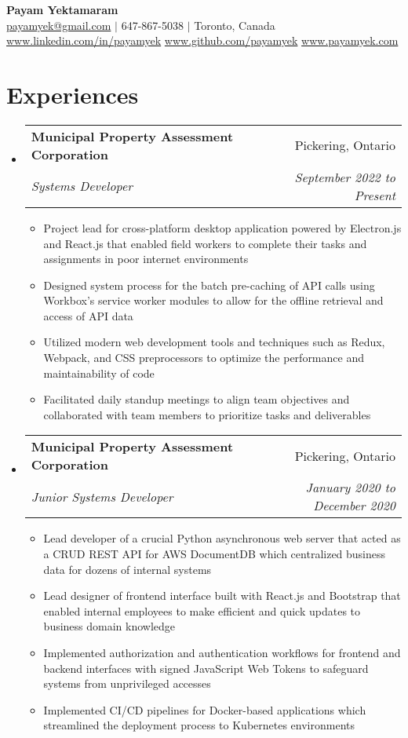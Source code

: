 \documentclass[letterpaper,10pt]{article}
\makeatletter
\newcommand{\resumeSubheading}[4]{
  \vspace{-1pt}\item
    \begin{tabular*}{0.97\textwidth}{l@{\extracolsep{\fill}}r}
      \textbf{#1} & #2 \\
      \textit{\small#3} & \textit{\small #4} \\
    \end{tabular*}\vspace{-2pt}
}
\newcommand{\resumeSubHeadingListStart}{\begin{itemize}[leftmargin=*]}
\newcommand{\resumeSubHeadingListEnd}{\end{itemize}}
\newcommand{\resumeItemListStart}{\begin{itemize}}
\newcommand{\resumeItemListEnd}{\end{itemize}\vspace{-3pt}}
\makeatother
\begin{document}
\textbf{\Huge Payam Yektamaram}\vspace{3pt}\\
\href{payamyek@gmail.com}{payamyek@gmail.com} $\big|$ 647-867-5038 $\big|$ Toronto, Canada \vspace{3pt} \\
\hspace{-6.4pt} \href{https://ca.linkedin.com/in/payamyek}{www.linkedin.com/in/payamyek} \hspace{3pt} \href{https://github.com/payamyek}{www.github.com/payamyek} \hspace{3pt} \href{https://payamyek.ca}{www.payamyek.com} \\

\section{Experiences}
  \resumeSubHeadingListStart
   \resumeSubheading
      {Municipal Property Assessment Corporation}{Pickering, Ontario}
      {Systems Developer}{September 2022 to Present}
      \resumeItemListStart
        \item{ \small{ Project lead for cross-platform desktop application powered by Electron.js and React.js that enabled field workers to complete their tasks and assignments in poor internet environments } }
        \item{ \small{ Designed system process for the batch pre-caching of API calls using Workbox's service worker modules to allow for the offline retrieval and access of API data  }}
        \item {\small { Utilized modern web development tools and techniques such as Redux, Webpack, and CSS preprocessors to optimize the performance and maintainability of code }}
        \item{ \small{ Facilitated daily standup meetings to align team objectives and collaborated with team members to prioritize tasks and deliverables }}
       \resumeItemListEnd
  
    \resumeSubheading
      {Municipal Property Assessment Corporation}{Pickering, Ontario}
      {Junior Systems Developer}{January 2020 to December 2020}
      \resumeItemListStart
        \item{ \small{ Lead developer of a crucial Python asynchronous web server that acted as a CRUD REST API for AWS DocumentDB which centralized business data for dozens of internal systems }}
        \item{ \small{ Lead designer of frontend interface built with React.js and Bootstrap that enabled internal employees to make efficient and quick updates to business domain knowledge }}
        \item{\small{ Implemented authorization and authentication workflows for frontend and backend interfaces with signed JavaScript Web Tokens to safeguard systems from unprivileged accesses }}
         \item{\small{ Implemented CI/CD pipelines for Docker-based applications which streamlined the deployment process to Kubernetes environments }}
       \resumeItemListEnd
  \resumeSubHeadingListEnd
    
\end{document}
